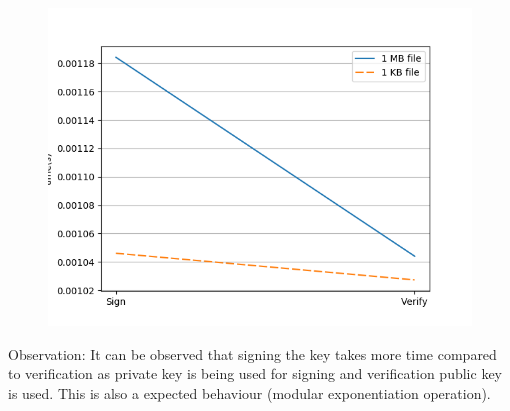 \documentclass[12pt]{article}%
\begin{document}
\begin{figure}[h]
    \centering
	\includegraphics[scale=0.5]{q1g}
\end{figure}

Observation: 
It can be observed that signing the key takes more time compared to verification as private key is being used for signing and verification public key is used. This is also a expected behaviour (modular exponentiation operation). 
\end{document}
